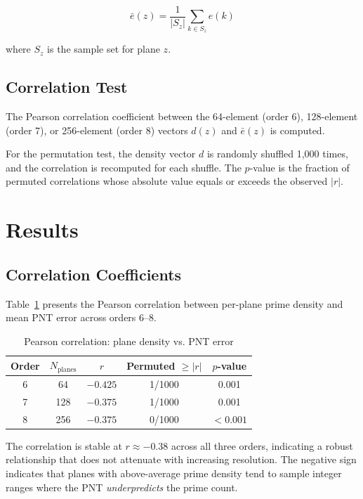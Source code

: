 \documentclass[11pt,a4paper]{article}
\begin{document}
\begin{equation}
\bar{e}(z) = \frac{1}{|S_z|} \sum_{k \in S_z} e(k)
\label{eq:mean_error}
\end{equation}

where $S_z$ is the sample set for plane $z$.

\subsection{Correlation Test}

The Pearson correlation coefficient between the 64-element (order 6),
128-element (order 7), or 256-element (order 8) vectors $d(z)$ and
$\bar{e}(z)$ is computed.

For the permutation test, the density vector $d$ is randomly shuffled
1,000 times, and the correlation is recomputed for each shuffle. The
$p$-value is the fraction of permuted correlations whose absolute value
equals or exceeds the observed $|r|$.

\section{Results}

\subsection{Correlation Coefficients}

Table~\ref{tab:correlation} presents the Pearson correlation between
per-plane prime density and mean PNT error across orders 6--8.

\begin{table}[h]
\centering
\caption{Pearson correlation: plane density vs. PNT error}
\label{tab:correlation}
\begin{tabular}{ccccc}
\toprule
Order & $N_{\text{planes}}$ & $r$ & Permuted $\geq |r|$ & $p$-value \\
\midrule
6 & 64    & $-0.425$ & 1/1000 & 0.001 \\
7 & 128   & $-0.375$ & 1/1000 & 0.001 \\
8 & 256   & $-0.375$ & 0/1000 & $<0.001$ \\
\bottomrule
\end{tabular}
\end{table}

The correlation is stable at $r \approx -0.38$ across all three orders,
indicating a robust relationship that does not attenuate with increasing
resolution. The negative sign indicates that planes with above-average
prime density tend to sample integer ranges where the PNT
\emph{underpredicts} the prime count.
\end{document}
